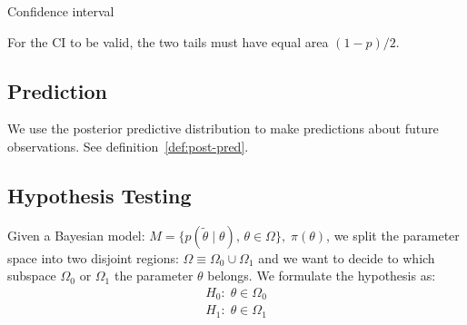 \begin{example}{Confidence interval}{}
	\begin{center}
	\end{center}
    \begin{note}
        For the CI to be valid, the two tails must have equal area $(1-p)/2$.
    \end{note}
\end{example}

\subsection{Prediction}

We use the posterior predictive distribution to make predictions about future observations.
See definition~\ref{def:post-pred}.

\subsection{Hypothesis Testing}

Given a Bayesian model: $M = \{p(\tilde \theta \mid \theta),\,\theta \in \Omega\},\; \pi(\theta)$,
we split the parameter space into two disjoint regions: $\Omega \equiv \Omega_0 \cup \Omega_1$
and we want to decide to which subspace $\Omega_0$ or $\Omega_1$ the parameter $\theta$ belongs.
We formulate the hypothesis as:
\begin{align*}
    H_0:\; \theta \in \Omega_0 \\
    H_1:\; \theta \in \Omega_1
\end{align*}

